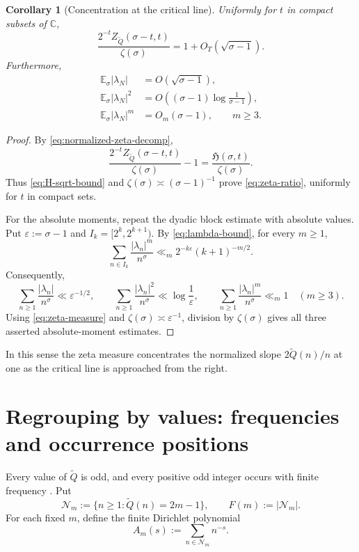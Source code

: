 \documentclass[11pt]{article}
\newtheorem{corollary}[theorem]{Corollary}
\theoremstyle{definition}
\theoremstyle{remark}
\newcommand{\Qp}{\widetilde Q}
\newcommand{\C}{\mathbb C}
\newcommand{\Hz}{\mathfrak H}
\newcommand{\eps}{\varepsilon}
\begin{document}
\begin{corollary}[Concentration at the critical line]
\label{cor:zeta-concentration}
Uniformly for \(t\) in compact subsets of \(\C\),
\begin{equation}
\frac{2^{-t}Z_{\Qp}(\sigma-t,t)}{\zeta(\sigma)}
=1+O_T\!\left(\sqrt{\sigma-1}\right).
\label{eq:zeta-ratio}
\end{equation}
Furthermore,
\begin{align}
\mathbb E_\sigma|\lambda_N|
&=O\!\left(\sqrt{\sigma-1}\right),\\
\mathbb E_\sigma|\lambda_N|^2
&=O\!\left((\sigma-1)\log\frac1{\sigma-1}\right),\\
\mathbb E_\sigma|\lambda_N|^m
&=O_m(\sigma-1),\qquad m\ge3.
\end{align}
\end{corollary}

\begin{proof}
By \eqref{eq:normalized-zeta-decomp},
\[
 \frac{2^{-t}Z_{\Qp}(\sigma-t,t)}{\zeta(\sigma)}-1
 =\frac{\Hz(\sigma,t)}{\zeta(\sigma)}.
\]
Thus \eqref{eq:H-sqrt-bound} and
\(\zeta(\sigma)\asymp(\sigma-1)^{-1}\) prove
\eqref{eq:zeta-ratio}, uniformly for \(t\) in compact sets.

For the absolute moments, repeat the dyadic block estimate with absolute
values.  Put \(\eps:=\sigma-1\) and \(I_k=[2^k,2^{k+1})\).  By
\eqref{eq:lambda-bound}, for every \(m\ge1\),
\[
 \sum_{n\in I_k}\frac{|\lambda_n|^m}{n^\sigma}
 \ll_m 2^{-k\eps}(k+1)^{-m/2}.
\]
Consequently,
\[
 \sum_{n\ge1}\frac{|\lambda_n|}{n^\sigma}
 \ll\eps^{-1/2},
 \qquad
 \sum_{n\ge1}\frac{|\lambda_n|^2}{n^\sigma}
 \ll\log\frac1\eps,
 \qquad
 \sum_{n\ge1}\frac{|\lambda_n|^m}{n^\sigma}
 \ll_m1\quad(m\ge3).
\]
Using \eqref{eq:zeta-measure} and
\(\zeta(\sigma)\asymp\eps^{-1}\), division by \(\zeta(\sigma)\)
gives all three asserted absolute-moment estimates.
\end{proof}

In this sense the zeta measure concentrates the normalized slope \(2\Qp(n)/n\) at one as the critical line is approached from the right.

\section{Regrouping by values: frequencies and occurrence positions}

Every value of \(\Qp\) is odd, and every positive odd integer occurs with finite frequency \cite{Cloitre2026,Mantovanelli2026Frequency}.  Put
\begin{equation}
\mathcal N_m:=\{n\ge1:\Qp(n)=2m-1\},
\qquad
F(m):=|\mathcal N_m|.
\label{eq:level-sets}
\end{equation}
For each fixed \(m\), define the finite Dirichlet polynomial
\begin{equation}
A_m(s):=\sum_{n\in\mathcal N_m}n^{-s}.
\label{eq:Am}
\end{equation}
\end{document}
